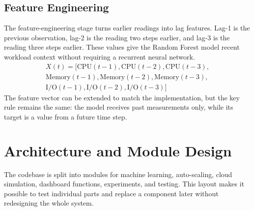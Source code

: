 \documentclass[10pt,journal,compsoc]{IEEEtran}
\begin{document}
\subsection{Feature Engineering}
The feature-engineering stage turns earlier readings into lag features. Lag-1 is the previous observation, lag-2 is the reading two steps earlier, and lag-3 is the reading three steps earlier. These values give the Random Forest model recent workload context without requiring a recurrent neural network.
\begin{multline}
X(t) = [\text{CPU}(t-1), \text{CPU}(t-2), \text{CPU}(t-3), \\
\text{Memory}(t-1), \text{Memory}(t-2), \text{Memory}(t-3), \\
\text{I/O}(t-1), \text{I/O}(t-2), \text{I/O}(t-3)] \tag{1}
\end{multline}
The feature vector can be extended to match the implementation, but the key rule remains the same: the model receives past measurements only, while its target is a value from a future time step.

\section{Architecture and Module Design}
The codebase is split into modules for machine learning, auto-scaling, cloud simulation, dashboard functions, experiments, and testing. This layout makes it possible to test individual parts and replace a component later without redesigning the whole system.
\end{document}
